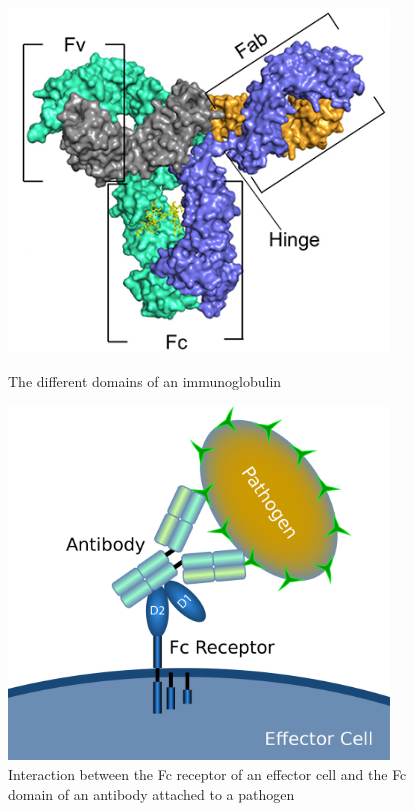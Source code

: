 \begin{figure}[H]
    \begin{minipage}{0.49\textwidth}
        \centering
        \includegraphics[width=0.9\textwidth]{../Images/antibody_domains.png}   
        \caption{The different domains of an immunoglobulin}
        \label{fig:antibody_domains}
    \end{minipage}\hfill
    \begin{minipage}{0.49\textwidth}
        \centering
        \includegraphics[width=0.9\textwidth]{../Images/Fc_receptor_interaction.png}   
        \caption{Interaction between the Fc receptor of an effector cell 
        and the Fc domain of an antibody attached to a pathogen}
        \label{fig:Fc_receptor_interaction}
    \end{minipage}
\end{figure}

